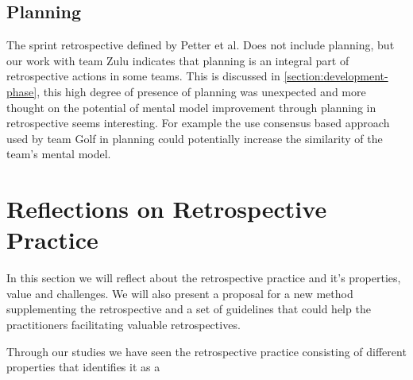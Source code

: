 \subsection{Planning}
The sprint retrospective defined by Petter et al. Does not include planning, but our work with team Zulu indicates that planning is an integral part of retrospective actions in some teams. This is discussed in \autoref{section:development-phase}, this high degree of presence of planning was unexpected and more thought on the potential of mental model improvement through planning in retrospective seems interesting. For example the use consensus based approach used by team Golf in planning could potentially increase the similarity of the team's mental model.


\clearpage
\section{Reflections on Retrospective Practice}
In this section we will reflect about the retrospective practice and it's properties, value and challenges. We will also present a proposal for a new method supplementing the retrospective and a set of guidelines that could help the practitioners facilitating valuable retrospectives. 

Through our studies we have seen the retrospective practice consisting of different properties that identifies it as a 

